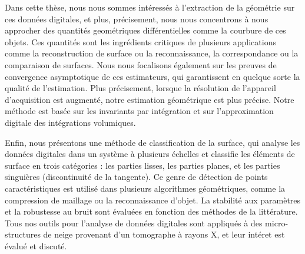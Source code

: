 Dans cette thèse, nous nous sommes intéressés à l'extraction de la géométrie sur
ces données digitales, et plus, précisement, nous nous concentrons à nous
approcher des quantités geométriques différentielles comme la courbure de ces
objets. Ces quantités sont les ingrédients critiques de plusieurs applications
comme la reconstruction de surface ou la reconnaissance, la correspondance ou la
comparaison de surfaces. Nous nous focalisons également sur les preuves de
convergence asymptotique de ces estimateurs, qui garantissent en quelque sorte
la qualité de l'estimation. Plus précisement, lorsque la résolution de
l'appareil d'acquisition est augmenté, notre estimation géométrique est plus
précise. Notre méthode est basée sur les invariants par intégration et sur
l'approximation digitale des intégrations volumiques.

Enfin, nous présentons une méthode de classification de la surface, qui analyse
les données digitales dans un système à plusieurs échelles et classifie les
éléments de surface en trois catégories : les parties lisses, les parties
planes, et les parties singuières (discontinuité de la tangente). Ce genre de
détection de points caractéristiques est utilisé dans plusieurs algorithmes
géométriques, comme la compression de maillage ou la reconnaissance d'objet. La
stabilité aux paramètres et la robustesse au bruit sont évaluées en fonction des
méthodes de la littérature. Tous nos outils pour l'analyse de données digitales
sont appliqués à des micro-structures de neige provenant d'un tomographe à
rayons X, et leur intéret est évalué et discuté.
